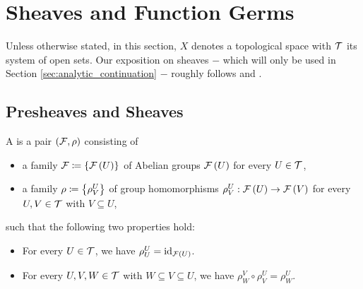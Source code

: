 \documentclass[../Moduli_Spaces_of_Riemann_Surfaces.tex]{subfiles}
\begin{document}
    \section{Sheaves and Function Germs}
    Unless otherwise stated, in this section, $X$ denotes a topological space with $\mathcal{T}$ its system of open sets. Our exposition on sheaves $-$ which will only be used in Section \ref{sec:analytic_continuation} $-$ roughly follows \cite[][Section 6]{forster} and \cite[][Chapter IX]{miranda}.
    \subsection{Presheaves and Sheaves}
    \begin{definition}
        A  is a pair $\left(\mathcal{F},\rho\right)$ consisting of
        \begin{itemize}
            \item a family $\mathcal{F}\coloneqq\left\{\mathcal{F}\left(U\right)\right\}$ of Abelian groups $\mathcal{F}\left(U\right)$ for every $U\in\mathcal{T}$,
                \vspace{-0.05in}
            \item a family $\rho\coloneqq\left\{\rho^U_V\right\}$ of group homomorphisms $\rho^U_V:\mathcal{F}\left(U\right)\to\mathcal{F}\left(V\right)$ for every $U,V\in\mathcal{T}$ with $V\subseteq U$,
        \end{itemize}
        such that the following two properties hold:
        \begin{itemize}
            \item For every $U\in\mathcal{T}$, we have $\rho^U_U=\operatorname{id}_{\mathcal{F}\left(U\right)}$.
                \vspace{-0.05in}
            \item For every $U,V,W\in\mathcal{T}$ with $W\subseteq V\subseteq U$, we have $\rho^V_W\circ\rho^U_V=\rho^U_W$.
        \end{itemize}
    \end{definition}
\end{document}
